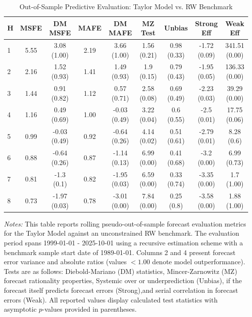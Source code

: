 \begin{table}[htbp]
\centering
\caption{Out-of-Sample Predictive Evaluation: Taylor Model vs. RW Benchmark}
\label{tab:taylor_model_evaluation}
\footnotesize
\begin{tabular}{l cccccccc}
\hline\hline
\rule{0pt}{3ex}
\textbf{H} & \textbf{MSFE} & \textbf{DM MSFE} & \textbf{MAFE} & \textbf{DM MAFE} & \textbf{MZ Test} & \textbf{Unbias} & \textbf{Strong Eff} & \textbf{Weak Eff} \\[0.5ex]
\hline
\rule{0pt}{2.5ex}
1 & 5.55 & 3.08 (1.00) & 2.19 & 3.66 (1.00) & 1.56 (0.21) & 0.98 (0.33) & -1.72 (0.09) & 341.51 (0.00) \\
2 & 2.16 & 1.52 (0.93) & 1.41 & 1.49 (0.93) & 1.9 (0.15) & 0.79 (0.43) & -1.95 (0.05) & 136.33 (0.00) \\
3 & 1.44 & 0.91 (0.82) & 1.12 & 0.57 (0.71) & 2.58 (0.08) & 0.69 (0.49) & -2.23 (0.03) & 39.29 (0.00) \\
4 & 1.16 & 0.49 (0.69) & 1.00 & -0.03 (0.49) & 3.22 (0.04) & 0.6 (0.55) & -2.5 (0.01) & 17.75 (0.06) \\
5 & 0.99 & -0.03 (0.49) & 0.92 & -0.64 (0.26) & 4.14 (0.02) & 0.51 (0.61) & -2.79 (0.01) & 8.28 (0.6) \\
6 & 0.88 & -0.64 (0.26) & 0.87 & -1.14 (0.13) & 6.99 (0.00) & 0.41 (0.68) & -3.2 (0.00) & 6.99 (0.73) \\
7 & 0.81 & -1.3 (0.1) & 0.82 & -1.95 (0.03) & 6.59 (0.00) & 0.33 (0.74) & -3.35 (0.00) & 1.7 (1.00) \\
8 & 0.73 & -1.97 (0.03) & 0.78 & -3.01 (0.00) & 7.84 (0.00) & 0.25 (0.8) & -3.58 (0.00) & 1.88 (1.00) \\
\hline\hline
\end{tabular}%
\par\smallskip
\parbox{\textwidth}{\scriptsize \textit{Notes:} This table reports rolling pseudo-out-of-sample forecast evaluation metrics for the Taylor Model against an unconstrained RW benchmark. The evaluation period spans 1999-01-01 - 2025-10-01 using a recursive estimation scheme with a benchmark sample start date of 1989-01-01. Columns 2 and 4 present forecast error variance and absolute ratios (values $< 1.00$ denote model outperformance). Tests are as follows: Diebold-Mariano (DM) statistics, Mincer-Zarnowitz (MZ) forecast rationality properties, Systemic over or underprediction (Unbias), if the forecast itself predicts forecast errors (Strong),and serial correlation in forecast errors (Weak). All reported values display calculated test statistics with asymptotic $p$-values provided in parentheses.}
\end{table}
